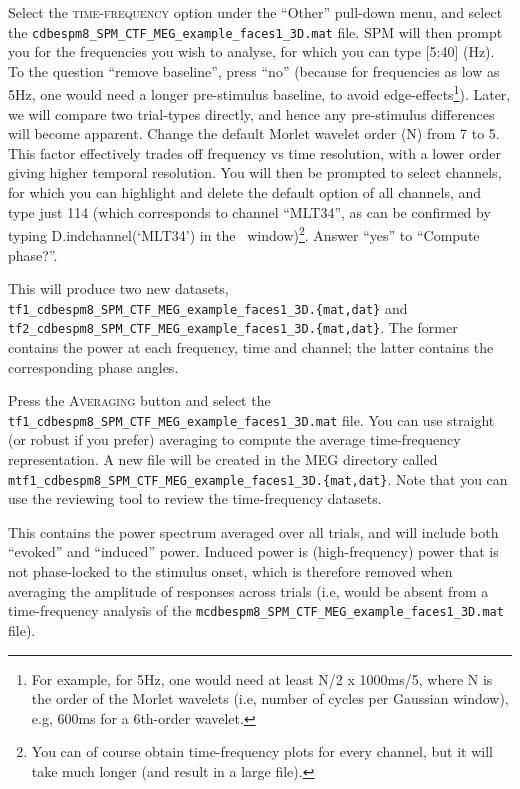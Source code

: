 Select the \textsc{time-frequency} option under the ``Other'' pull-down menu, and select the \texttt{cdbespm8\_\-SPM\_\-CTF\_\-MEG\_\-example\_\-faces1\_\-3D.mat} file. SPM will then prompt you for the frequencies you wish to analyse, for which you can type [5:40] (Hz). To the question ``remove baseline'', press ``no'' (because for frequencies as low as 5Hz, one would need a longer pre-stimulus baseline, to avoid edge-effects\footnote{For example, for 5Hz, one would need at least N/2 x 1000ms/5, where N is the order of the Morlet wavelets (i.e, number of cycles per Gaussian window), e.g, 600ms for a 6th-order wavelet.}). Later, we will compare two trial-types directly, and hence any pre-stimulus differences will become apparent. Change the default Morlet wavelet order (N) from 7 to 5. This factor effectively trades off frequency vs time resolution, with a lower order giving higher temporal resolution. You will then be prompted to select channels, for which you can highlight and delete the default option of all channels, and type just 114 (which corresponds to channel ``MLT34'', as can be confirmed by typing D.indchannel(`MLT34') in the \matlab\ window)\footnote{You can of course obtain time-frequency plots for every channel, but it will take much longer (and result in a large file).}. Answer ``yes'' to ``Compute phase?''.

This will produce two new datasets, \texttt{tf1\_\-cdbespm8\_\-SPM\_\-CTF\_\-MEG\_\-example\_\-faces1\_3D.\{mat,dat\}} and  \texttt{tf2\_\-cdbespm8\_\-SPM\_\-CTF\_\-MEG\_\-example\_\-faces1\_\-3D.\{mat,dat\}}. The former contains the power at each frequency, time and channel; the latter contains the corresponding phase angles.

Press the \textsc{Averaging} button and select the \texttt{tf1\_\-cdbespm8\_\-SPM\_\-CTF\_\-MEG\_\-example\_\-faces1\_\-3D.mat} file. You can use straight (or robust if you prefer) averaging to compute the average time-frequency representation. A new file will be created in the MEG directory called \texttt{mtf1\_cdbespm8\_\-SPM\_\-CTF\_\-MEG\_\-example\_\-faces1\_\-3D.\{mat,dat\}}. Note that you can use the reviewing tool to review the time-frequency datasets.

This contains the power spectrum averaged over all trials, and will include both ``evoked'' and ``induced'' power. Induced power is (high-frequency) power that is not phase-locked to the stimulus onset, which is therefore removed when averaging the amplitude of responses across trials (i.e, would be absent from a time-frequency analysis of the \texttt{mcdbespm8\_SPM\_\-CTF\_\-MEG\_\-example\_\-faces1\_\-3D.mat} file).

